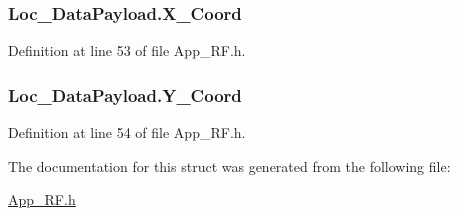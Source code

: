 \hypertarget{struct_loc___data_payload_a6669b0646254b2c5fe8a47029330ca31}{
\subsubsection[{X\_\-Coord}]{ {\bf Loc\_\-DataPayload.X\_\-Coord}}}
\label{struct_loc___data_payload_a6669b0646254b2c5fe8a47029330ca31}


Definition at line 53 of file App\_\-RF.h.

\hypertarget{struct_loc___data_payload_a23be92cb56ffff4211182f81a2c8025b}{
\subsubsection[{Y\_\-Coord}]{ {\bf Loc\_\-DataPayload.Y\_\-Coord}}}
\label{struct_loc___data_payload_a23be92cb56ffff4211182f81a2c8025b}


Definition at line 54 of file App\_\-RF.h.



The documentation for this struct was generated from the following file:\begin{DoxyCompactItemize}
\item 
\hyperlink{_app___r_f_8h}{App\_\-RF.h}\end{DoxyCompactItemize}
